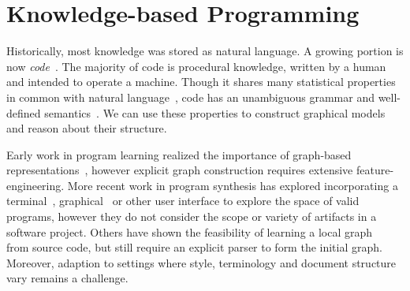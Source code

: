 \documentclass[12pt]{article}
\newcommand*\circled[1]{\tikz[baseline=-0.1cm]{\node[shape=circle,draw,inner sep=0.48pt] (char) {\fontsize{7}{12}\textsf{#1}};}}
\begin{document}
%
%

\section{Knowledge-based Programming}

Historically, most knowledge was stored as natural language. A growing portion is now \textit{code}~\cite{allamanis2018survey}. The majority of code is procedural knowledge, written by a human and intended to operate a machine. Though it shares many statistical properties in common with natural language~\cite{hindle2012naturalness}, code has an unambiguous grammar and well-defined semantics~\cite{pierce2010software}. We can use these properties to construct graphical models and reason about their structure.

Early work in program learning realized the importance of graph-based representations~\cite{allamanis2017learning}, however explicit graph construction requires extensive feature-engineering. More recent work in program synthesis has explored incorporating a terminal~\cite{ellis2019write}, graphical~\cite{walke2020learning} or other user interface to explore the space of valid programs, however they do not consider the scope or variety of artifacts in a software project. Others have shown the feasibility of learning a local graph~\cite{johnson2020learning} from source code, but still require an explicit parser to form the initial graph. Moreover, adaption to settings where style, terminology and document structure vary remains a challenge.
\end{document}
